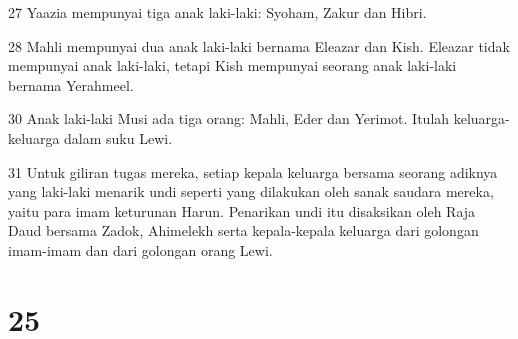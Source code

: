 \par 27 Yaazia mempunyai tiga anak laki-laki: Syoham, Zakur dan Hibri.
\par 28 Mahli mempunyai dua anak laki-laki bernama Eleazar dan Kish. Eleazar tidak mempunyai anak laki-laki, tetapi Kish mempunyai seorang anak laki-laki bernama Yerahmeel.
\par 30 Anak laki-laki Musi ada tiga orang: Mahli, Eder dan Yerimot. Itulah keluarga-keluarga dalam suku Lewi.
\par 31 Untuk giliran tugas mereka, setiap kepala keluarga bersama seorang adiknya yang laki-laki menarik undi seperti yang dilakukan oleh sanak saudara mereka, yaitu para imam keturunan Harun. Penarikan undi itu disaksikan oleh Raja Daud bersama Zadok, Ahimelekh serta kepala-kepala keluarga dari golongan imam-imam dan dari golongan orang Lewi.

\chapter{25}


